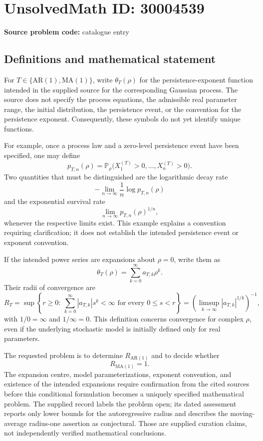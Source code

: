 \documentclass[11pt]{article}
\begin{document}
\section*{UnsolvedMath ID: 30004539}
\textbf{Source problem code:} catalogue entry
\subsection{Definitions and mathematical statement}
For \(T\in\{\mathrm{AR}(1),\mathrm{MA}(1)\}\), write \(\theta_T(\rho)\) for the persistence-exponent function intended in the supplied source for the corresponding Gaussian process. The source does not specify the process equations, the admissible real parameter range, the initial distribution, the persistence event, or the convention for the persistence exponent. Consequently, these symbols do not yet identify unique functions.

For example, once a process law and a zero-level persistence event have been specified, one may define
\[
 p_{T,n}(\rho)=\mathbb P_\rho\bigl(X_1^{(T)}>0,\ldots,X_n^{(T)}>0\bigr).
\]
Two quantities that must be distinguished are the logarithmic decay rate
\[
 -\lim_{n\to\infty}\frac{1}{n}\log p_{T,n}(\rho)
\]
and the exponential survival rate
\[
 \lim_{n\to\infty}p_{T,n}(\rho)^{1/n},
\]
whenever the respective limits exist. This example explains a convention requiring clarification; it does not establish the intended persistence event or exponent convention.

If the intended power series are expansions about \(\rho=0\), write them as
\[
 \theta_T(\rho)=\sum_{k=0}^{\infty}a_{T,k}\rho^k.
\]
Their radii of convergence are
\[
 R_T=\sup\left\{r\geq0:\ \sum_{k=0}^{\infty}|a_{T,k}|s^k<\infty
 \text{ for every }0\leq s<r\right\}
 =\left(\limsup_{k\to\infty}|a_{T,k}|^{1/k}\right)^{-1},
\]
with \(1/0=\infty\) and \(1/\infty=0\). This definition concerns convergence for complex \(\rho\), even if the underlying stochastic model is initially defined only for real parameters.

The requested problem is to determine \(R_{\mathrm{AR}(1)}\) and to decide whether
\[
 R_{\mathrm{MA}(1)}=1.
\]
The expansion centre, model parameterizations, exponent convention, and existence of the intended expansions require confirmation from the cited sources before this conditional formulation becomes a uniquely specified mathematical problem. The supplied record labels the problem open; its dated assessment reports only lower bounds for the autoregressive radius and describes the moving-average radius-one assertion as conjectural. Those are supplied curation claims, not independently verified mathematical conclusions.
\end{document}
